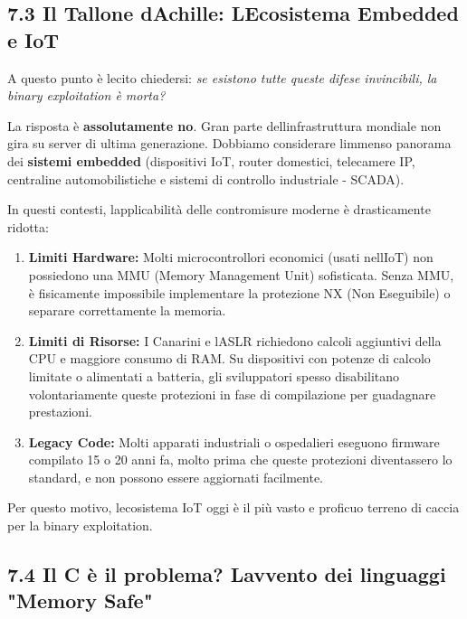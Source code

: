\documentclass[11pt,a4paper]{article}
\begin{document}
\subsection{7.3 Il Tallone d\textquotesingle Achille:
L\textquotesingle Ecosistema Embedded e
IoT}\label{il-tallone-dachille-lecosistema-embedded-e-iot}

A questo punto è lecito chiedersi: \emph{se esistono tutte queste difese
invincibili, la binary exploitation è morta?}

La risposta è \textbf{assolutamente no}. Gran parte
dell\textquotesingle infrastruttura mondiale non gira su server di
ultima generazione. Dobbiamo considerare l\textquotesingle immenso
panorama dei \textbf{sistemi embedded} (dispositivi IoT, router
domestici, telecamere IP, centraline automobilistiche e sistemi di
controllo industriale - SCADA).

In questi contesti, l\textquotesingle applicabilità delle contromisure
moderne è drasticamente ridotta:

\begin{enumerate}
\def\labelenumi{\arabic{enumi}.}
\item
  \textbf{Limiti Hardware:} Molti microcontrollori economici (usati
  nell\textquotesingle IoT) non possiedono una MMU (Memory Management
  Unit) sofisticata. Senza MMU, è fisicamente impossibile implementare
  la protezione NX (Non Eseguibile) o separare correttamente la memoria.
\item
  \textbf{Limiti di Risorse:} I Canarini e l\textquotesingle ASLR
  richiedono calcoli aggiuntivi della CPU e maggiore consumo di RAM. Su
  dispositivi con potenze di calcolo limitate o alimentati a batteria,
  gli sviluppatori spesso disabilitano volontariamente queste protezioni
  in fase di compilazione per guadagnare prestazioni.
\item
  \textbf{Legacy Code:} Molti apparati industriali o ospedalieri
  eseguono firmware compilato 15 o 20 anni fa, molto prima che queste
  protezioni diventassero lo standard, e non possono essere aggiornati
  facilmente.
\end{enumerate}

Per questo motivo, l\textquotesingle ecosistema IoT oggi è il più vasto
e proficuo terreno di caccia per la binary exploitation.

\subsection{7.4 Il C è il problema? L\textquotesingle avvento dei
linguaggi "Memory
Safe"}\label{il-c-uxe8-il-problema-lavvento-dei-linguaggi-memory-safe}
\end{document}
